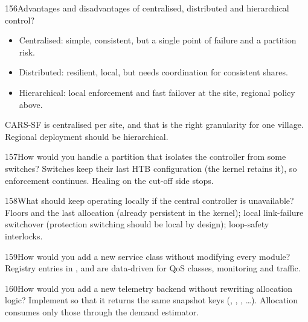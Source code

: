 \begin{qa}{156}{Advantages and disadvantages of centralised, distributed and hierarchical control?}
\begin{itemize}
\item Centralised: simple, consistent, but a single point of failure and a partition risk.
\item Distributed: resilient, local, but needs coordination for consistent shares.
\item Hierarchical: local enforcement and fast failover at the site, regional policy above.
\end{itemize}
CARS-SF is centralised per site, and that is the right granularity for one village. Regional deployment should be
hierarchical.
\end{qa}

\begin{qa}{157}{How would you handle a partition that isolates the controller from some switches?}
Switches keep their last HTB configuration (the kernel retains it), so enforcement continues. Healing on the cut-off
side stops.
\end{qa}

\begin{qa}{158}{What should keep operating locally if the central controller is unavailable?}
Floors and the last allocation (already persistent in the kernel); local link-failure switchover (protection
switching should be local by design); loop-safety interlocks.
\end{qa}

\begin{qa}{159}{How would you add a new service class without modifying every module?}
Registry entries in ,  and  are data-driven for QoS
classes, monitoring and traffic.
\end{qa}

\begin{qa}{160}{How would you add a new telemetry backend without rewriting allocation logic?}
Implement  so that it returns the same snapshot keys (,
, , …). Allocation consumes only those through the demand
estimator.
\end{qa}

